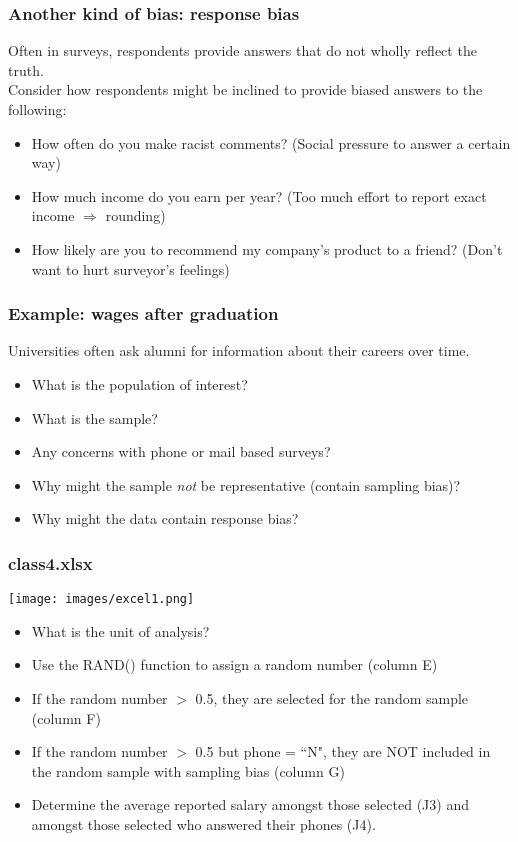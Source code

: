 \documentclass[11pt]{beamer}
\begin{document}
\begin{frame}
\frametitle{Another kind of bias: \alert{response bias}}
Often in surveys, respondents provide answers that do not wholly reflect the truth. \\ \bigskip \pause
Consider how respondents might be inclined to provide biased answers to the following:
\begin{itemize}
	\item How often do you make racist comments? \pause (\alert{Social pressure} to answer a certain way) \pause
	\item How much income do you earn per year? \pause (Too much effort to report exact income $\Rightarrow$ \alert{rounding}) \pause
	\item How likely are you to recommend my company's product to a friend? \pause (Don't want to hurt surveyor's feelings)
\end{itemize}
\end{frame}

\begin{frame}
 \frametitle{Example: wages after graduation}
Universities often ask alumni for information about their careers over time.
\begin{itemize}
\item What is the \alert{population} of interest?\pause
\item What is the \alert{sample}?\pause
\item Any concerns with phone or mail based surveys?\pause
\item Why might the sample \textit{not} be representative (contain sampling bias)? \pause
\item Why might the data contain response bias? 
\end{itemize}
\end{frame}

\begin{frame}
\frametitle{class4.xlsx}
 \begin{center}
	\texttt{[image: images/excel1.png]} 
\end{center}
\begin{itemize}
	\item What is the unit of analysis? \pause
	\item Use the \alert{RAND()} function to assign a random number (column E) \pause
	\item If the random number $>$ 0.5, they are selected for the random sample (column F) \pause
	\item If the random number $>$ 0.5 but phone = ``N", they are NOT included in the random sample with sampling bias (column G) \pause
	\item Determine the average reported salary amongst those selected (J3) and amongst those selected who answered their phones (J4). 
\end{itemize}
\end{frame}
\end{document}

